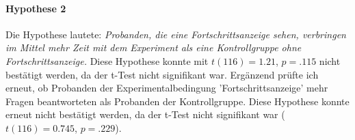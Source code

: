 \paragraph{Hypothese 2}
Die Hypothese lautete: \textit{Probanden, die eine Fortschrittsanzeige sehen, verbringen im Mittel mehr Zeit mit dem Experiment als eine Kontrollgruppe ohne Fortschrittsanzeige.} Diese Hypothese konnte mit $t(116)=1.21$, $p=.115$ nicht bestätigt werden, da der t-Test nicht signifikant war. Ergänzend prüfte ich erneut, ob Probanden der Experimentalbedingung 'Fortschrittsanzeige' mehr Fragen beantworteten als Probanden der Kontrollgruppe. Diese Hypothese konnte erneut nicht bestätigt werden, da der t-Test nicht signifikant war ($t(116)=0.745$, $p=.229$).
